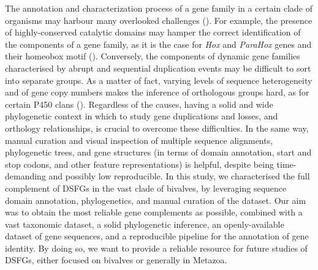 \documentclass[../main.tex]{subfiles}
\begin{document}
The annotation and characterization process of a gene family in a certain clade of organisms may harbour many overlooked challenges (\textbf{\cite{vizueta2020bitacora}}). For example, the presence of highly-conserved catalytic domains may hamper the correct identification of the components of a gene family, as it is the case for \textit{Hox} and \textit{ParaHox} genes and their homeobox motif (\textbf{\cite{nicolini2023comparative,baldwin2018new}}). Conversely, the components of dynamic gene families characterised by abrupt and sequential duplication events may be difficult to sort into separate groups. As a matter of fact, varying levels of sequence heterogeneity and of gene copy numbers makes the inference of orthologous groups hard, as for certain P450 clans (\textbf{\cite{dermauw2020diversity}}). Regardless of the causes, having a solid and wide phylogenetic context in which to study gene duplications and losses, and orthology relationships, is crucial to overcome these difficulties. In the same way, manual curation and visual inspection of multiple sequence alignments, phylogenetic trees, and gene structures (in terms of domain annotation, start and stop codons, and other feature representations) is helpful, despite being time-demanding and possibly low reproducible. In this study, we characterised the full complement of DSFGs in the vast clade of bivalves, by leveraging sequence domain annotation, phylogenetics, and manual curation of the dataset. Our aim was to obtain the most reliable gene complements as possible, combined with a vast taxonomic dataset, a solid phylogenetic inference, an openly-available dataset of gene sequences, and a reproducible pipeline for the annotation of gene identity. By doing so, we want to provide a reliable resource for future studies of DSFGs, either focused on bivalves or generally in Metazoa.
\end{document}
